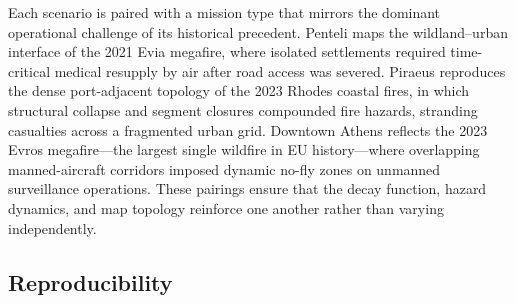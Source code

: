 \documentclass[drones,article,submit,moreauthors]{Definitions/mdpi}
\begin{document}
Each scenario is paired with a mission type that mirrors the
dominant operational challenge of its historical precedent.
Penteli maps the wildland--urban interface of the 2021 Evia
megafire, where isolated settlements required time-critical
medical resupply by air after road access was severed.
Piraeus reproduces the dense port-adjacent topology of the
2023 Rhodes coastal fires, in which structural collapse and
segment closures compounded fire hazards, stranding casualties
across a fragmented urban grid. Downtown Athens reflects the
2023 Evros megafire---the largest single wildfire in EU
history---where overlapping manned-aircraft corridors imposed
dynamic no-fly zones on unmanned surveillance operations.
These pairings ensure that the decay function, hazard
dynamics, and map topology reinforce one another rather
than varying independently.

\begin{table}[!htb]
\centering
\caption{Scenario overview. Three OSM-based scenarios grounded in real Greek wildfires.}
\label{tab:scenario_overview}
\end{table}

\subsection{Reproducibility}\label{sec:reproducibility}
\end{document}
